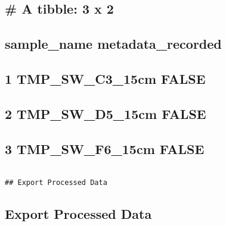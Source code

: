 \documentclass[
]{article}
\begin{document}
\begin{verbatim}
\end{verbatim}

\hypertarget{a-tibble-3-x-2}{%
\subsection{\# A tibble: 3 x 2}\label{a-tibble-3-x-2}}

\hypertarget{sample_name-metadata_recorded}{%
\subsection{sample\_name
metadata\_recorded}\label{sample_name-metadata_recorded}}

\hypertarget{section}{%
\subsection{\texorpdfstring{ }{ }}\label{section}}

\hypertarget{tmp_sw_c3_15cm-false}{%
\subsection{1 TMP\_SW\_C3\_15cm FALSE}\label{tmp_sw_c3_15cm-false}}

\hypertarget{tmp_sw_d5_15cm-false}{%
\subsection{2 TMP\_SW\_D5\_15cm FALSE}\label{tmp_sw_d5_15cm-false}}

\hypertarget{tmp_sw_f6_15cm-false}{%
\subsection{3 TMP\_SW\_F6\_15cm FALSE}\label{tmp_sw_f6_15cm-false}}

\begin{verbatim}

## Export Processed Data  
\end{verbatim}

\hypertarget{export-processed-data}{%
\subsection{Export Processed Data}\label{export-processed-data}}

\begin{verbatim}
\end{verbatim}
\end{document}
